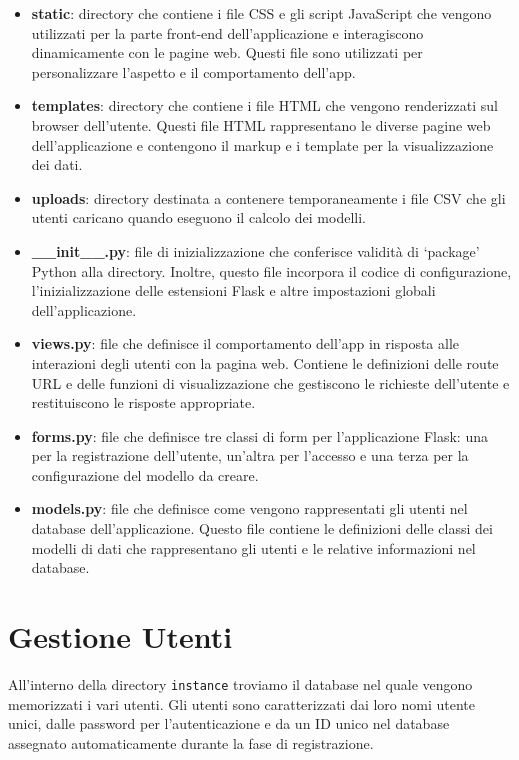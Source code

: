 \documentclass{rapportECL}
\begin{document}
\begin{itemize}
  \item \textbf{static}: directory che contiene i file CSS e gli script JavaScript che vengono utilizzati per la parte front-end dell'applicazione 
  e interagiscono dinamicamente con le pagine web. Questi file sono utilizzati per personalizzare l'aspetto e il comportamento dell'app.
  \item \textbf{templates}: directory che contiene  i file HTML che vengono renderizzati sul browser dell'utente. Questi file HTML rappresentano 
  le diverse pagine web dell'applicazione e contengono il markup e i template per la visualizzazione dei dati.
  \item \textbf{uploads}: directory destinata a contenere temporaneamente i file CSV che gli utenti caricano quando eseguono il calcolo dei modelli. 
  \item \textbf{\_\_init\_\_.py}: file di inizializzazione che conferisce validità di `package' Python alla directory. 
  Inoltre, questo file incorpora il codice di configurazione, l'inizializzazione delle estensioni Flask e altre impostazioni globali dell'applicazione.
  \item \textbf{views.py}: file che definisce il comportamento dell'app in risposta alle interazioni degli utenti con la pagina web. Contiene le definizioni 
  delle route URL e delle funzioni di visualizzazione che gestiscono le richieste dell'utente e restituiscono le risposte appropriate.
  \item \textbf{forms.py}: file che definisce tre classi di form per l'applicazione Flask: una per la registrazione dell'utente, un'altra per l'accesso e 
  una terza per la configurazione del modello da creare.
  \item \textbf{models.py}: file che definisce come vengono rappresentati gli utenti nel database dell'applicazione. Questo file contiene le definizioni 
  delle classi dei modelli di dati che rappresentano gli utenti e le relative informazioni nel database.
\end{itemize}


\section{Gestione Utenti}
All'interno della directory \texttt{instance} troviamo il database nel quale vengono memorizzati i vari utenti. Gli utenti
sono caratterizzati dai loro nomi utente unici, dalle password per l'autenticazione e da un ID unico nel database assegnato 
automaticamente durante la fase di registrazione.
\end{document}
